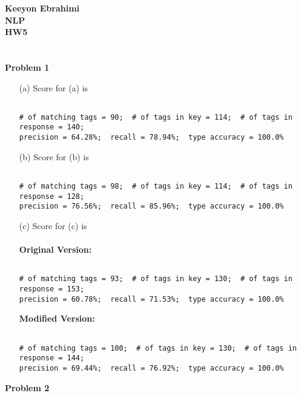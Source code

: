 \documentclass[ruled]{article}
\begin{document}
\textbf{Keeyon Ebrahimi}\\
\textbf{NLP}\\
\textbf{HW5}\\ \\ \\
\textbf{Problem 1}

\begin{itemize}
\item[(a)] 
Score for (a) is 
\begin{verbatim}

# of matching tags = 90;  # of tags in key = 114;  # of tags in response = 140;
precision = 64.28%;  recall = 78.94%;  type accuracy = 100.0%

\end{verbatim}
\item[(b)]
Score for (b) is
\begin{verbatim}

# of matching tags = 98;  # of tags in key = 114;  # of tags in response = 128;
precision = 76.56%;  recall = 85.96%;  type accuracy = 100.0%

\end{verbatim}
\item[(c)]
Score for (c) is\\ \\
\textbf{Original Version:}
\begin{verbatim}

# of matching tags = 93;  # of tags in key = 130;  # of tags in response = 153;
precision = 60.78%;  recall = 71.53%;  type accuracy = 100.0%

\end{verbatim}

\textbf{Modified Version:} 
\begin{verbatim}

# of matching tags = 100;  # of tags in key = 130;  # of tags in response = 144;
precision = 69.44%;  recall = 76.92%;  type accuracy = 100.0%

\end{verbatim}

\end{itemize}
\textbf{Problem 2}
\end{document}
